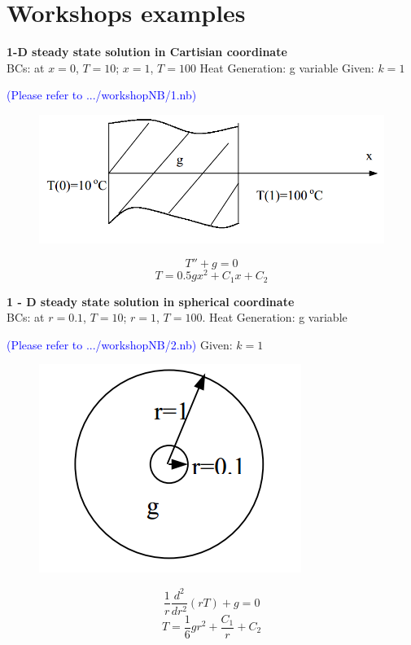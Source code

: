 \appendix
\renewcommand{\thechapter}{\arabic{chapter}}
\chapter{Workshops examples}

\newcommand{\myWSEgPath}[1] {
  \textcolor{blue} {(Please refer to .../workshopNB/#1.nb)}}

\begin{example}
\textbf{1-D steady state solution in Cartisian coordinate}\\
BCs: at $x=0$, $T=10$; 
$x=1$, $T=100$ Heat Generation: g variable Given: $k=1$
\myWSEgPath{1}
\begin{figure}[H]
  \centering
    \includegraphics[scale=0.5]{figures/appendixA/1}
\end{figure}
$$T''+g=0$$
$$T=0.5gx^2+C_1x+C_2$$
\end{example}


\begin{example}
\textbf{1 - D steady state solution in spherical coordinate}\\
BCs: at $r = 0.1$, $T = 10$; $r = 1$, $T = 100$.
Heat Generation: g variable
\myWSEgPath{2}
Given: $k=1$
\begin{figure}[H]
  \centering
    \includegraphics[scale=0.5]{figures/appendixA/2}
\end{figure}
$$\frac{1}{r}\frac{d^2}{dr^2}(rT)+g=0$$
$$T=\frac{1}{6}gr^2+\frac{C_1}{r}+C_2$$
\end{example}

